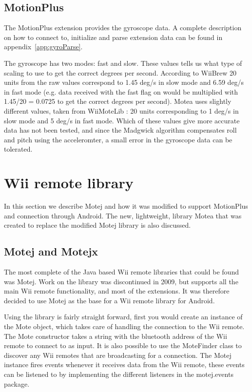 \subsection{MotionPlus}
The MotionPlus extension provides the gyroscope data. A complete description on how to connect to, initialize and parse extension data can be found in appendix~\ref{app:gyroParse}.

The gyroscope has two modes: fast and slow. These values tells us what type of scaling to use to get the correct degrees per second. According to WiiBrew \cite{wiiBrew} 20 units from the raw values correspond to 1.45 deg/s in slow mode and 6.59 deg/s in fast mode (e.g. data received with the fast flag on would be multiplied with 1.45/20 = 0.0725 to get the correct degrees per second). Motea uses slightly different values, taken from WiiMoteLib \cite{wiiMoteLib}: 20 units corresponding to 1 deg/s in slow mode and 5 deg/s in fast mode. Which of these values give more accurate data has not been tested, and since the Madgwick algorithm \cite{madgwick} compensates roll and pitch using the acceleromter, a small error in the gyroscope data can be tolerated.

\section{Wii remote library}
In this section we describe Motej and how it was modified to support MotionPlus and connection through Android. The new, lightweight, library Motea that was created to replace the modified Motej library is also discussed.

\subsection{Motej and Motejx}
The most complete of the Java based Wii remote libraries that could be found was Motej. Work on the library was discontinued in 2009, but supports all the main Wii remote functionality, and most of the extensions. It was therefore decided to use Motej as the base for a Wii remote library for Android. 

Using the library is fairly straight forward, first you would create an instance of the Mote object, which takes care of handling the connection to the Wii remote. The Mote constructor takes a string with the bluetooth address of the Wii remote to connect to as input. It is also possible to use the MoteFinder class to discover any Wii remotes that are broadcasting for a connection. The Motej instance fires events whenever it receives data from the Wii remote, these events can be listened to by implementing the different listeners in the motej.events package. 

